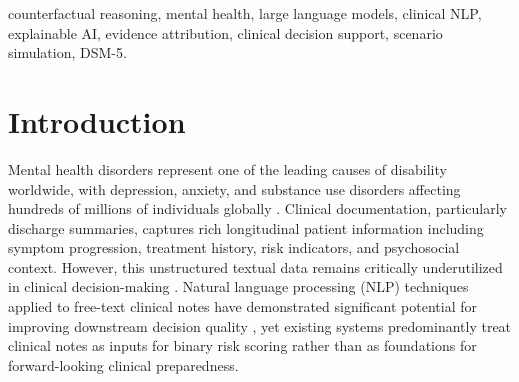 \documentclass[conference]{IEEEtran}
\begin{document}
\begin{abstract}
Clinical notes on patients with mental health conditions contain rich, unstructured information that remains critically underutilized in clinical decision-making. Existing AI systems for mental health prioritize risk score prediction, leaving clinicians unprepared for extreme adverse patient trajectories. We propose and implement a fine-tuned large language model (LLM) framework with post-hoc explainability that acts as a second reader of mental health documentation---not to predict outcomes, but to prepare clinicians for extreme patient trajectories. The framework operates through a multi-stage pipeline: (1)~Clinical Factor Extraction using a LoRA-adapted Microsoft Phi-3.5-Mini-Instruct model with DSM-5/ICD-11 grounded schema; (2)~Post-Extraction Validation including ICD code normalization, context enrichment for housing/trauma/functional decline, and negation-aware critical signal detection; (3)~Evidence-Based Branch Gating that conditionally executes scenario pathways only when clinical evidence exists; (4)~Tree-of-Thoughts Scenario Generation across three escalation pathways (psychiatric deterioration, substance use, social collapse); (5)~Clinical Report Generation with consistency checking and severity inference; and (6)~Counterfactual Evidence Attribution, an explainable AI layer that maps each generated scenario trigger back to specific text spans in the original clinical note with color-coded highlighting and nexus factor detection. The system is trained on 94,592 de-identified discharge summaries from MIMIC-IV, achieving evaluation loss of 1.706 and 67.5\% mean token accuracy. We present the complete architecture, training methodology, and qualitative analysis demonstrating grounded counterfactual generation with interpretable evidence trails.
\end{abstract}

\begin{IEEEkeywords}
counterfactual reasoning, mental health, large language models, clinical NLP, explainable AI, evidence attribution, clinical decision support, scenario simulation, DSM-5.
\end{IEEEkeywords}

\section{Introduction}

Mental health disorders represent one of the leading causes of disability worldwide, with depression, anxiety, and substance use disorders affecting hundreds of millions of individuals globally \cite{b1}. Clinical documentation, particularly discharge summaries, captures rich longitudinal patient information including symptom progression, treatment history, risk indicators, and psychosocial context. However, this unstructured textual data remains critically underutilized in clinical decision-making \cite{b2}. Natural language processing (NLP) techniques applied to free-text clinical notes have demonstrated significant potential for improving downstream decision quality \cite{b3}, yet existing systems predominantly treat clinical notes as inputs for binary risk scoring rather than as foundations for forward-looking clinical preparedness.
\end{document}

